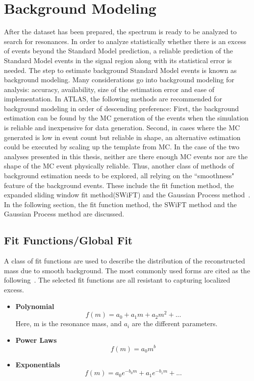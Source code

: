 \section{Background Modeling}
\label{sec:backgroundest}
After the dataset has been prepared, the spectrum is ready to be analyzed to search for resonances. In order to analyze statistically whether there is an excess of events beyond the Standard Model prediction, a reliable prediction of the Standard Model events in the signal region along with its statistical error is needed. The step to estimate background Standard Model events is known as background modeling.
Many considerations go into background modeling for analysis: accuracy, availability, size of the estimation error and ease of implementation. In ATLAS, the following methods are recommended for background modeling in order of descending preference:
    First, the background estimation can be found by the MC generation of the events when the simulation is reliable and inexpensive for data generation. Second, in cases where the MC generated is low in event count but reliable in shape, an alternative estimation could be executed by scaling up the template from MC. In the case of the two analyses presented in this thesis, neither are there enough MC events nor are the shape of the MC event physically reliable. Thus, another class of methods of background estimation needs to be explored, all relying on the ``smoothness" feature of the background events. These include the fit function method, the expanded sliding window fit method(SWiFT) and the Gaussian Process method~\cite{frate2017modeling}.
    In the following section, the fit function method, the SWiFT method and the Gaussian Process method are discussed.

\subsection{Fit Functions/Global Fit}
\label{sec:fitfunction}
A class of fit functions are used to describe the distribution of the reconstructed mass due to smooth background. The most commonly used forms are cited as the following~\cite{ATL-PHYS-PUB-2020-028}. The selected fit functions are all resistant to capturing localized excess.

    \begin{itemize}

    \item \textbf{Polynomial}
        \begin{equation}
            f(m)= a_0 + a_{1}m + a_{2}m^{2}+...
        \end{equation} Here, m is the resonance mass, and $a_{i}$ are the different parameters.
    \item \textbf{Power Laws}
        \begin{equation}
            f(m)= a_{0}m^{b}
        \end{equation}

    \item \textbf{Exponentials}
        \begin{equation}
            f(m) = a_{0}e^{-b_{0}m} +a_{1}e^{-b_{1}m}+...
        \end{equation}
    \end{itemize}


